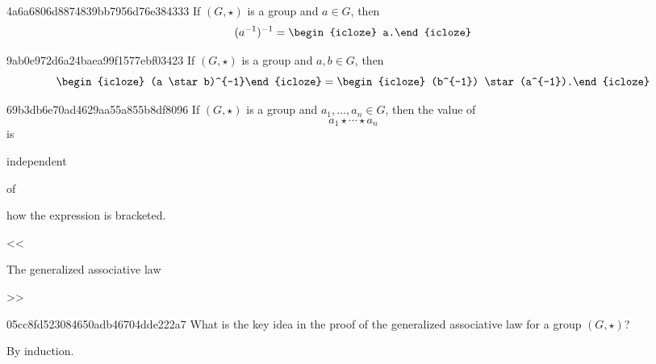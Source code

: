 \begin{note}{4a6a6806d8874839bb7956d76e384333}
    If \({ (G, \star) }\) is a group and \({ a \in G }\), then
    \[
        (a^{-1})^{-1} = \begin{icloze}{1}a.\end{icloze}
    \]
\end{note}

\begin{note}{9ab0e972d6a24baea99f1577ebf03423}
    If \({ (G, \star) }\) is a group and \({ a, b \in G }\), then
    \[
        \begin{icloze}{2}(a \star b)^{-1}\end{icloze} = \begin{icloze}{1}(b^{-1}) \star (a^{-1}).\end{icloze}
    \]
\end{note}

\begin{note}{69b3db6e70ad4629aa55a855b8df8096}
    If \({ (G, \star) }\) is a group and \({ a_1, \ldots, a_n \in G }\), then
    the value of
    \[
        a_1 \star \cdots \star a_n
    \]
    is \begin{icloze}{2}independent\end{icloze} of \begin{icloze}{1}how the expression is bracketed.\end{icloze}

    \begin{center}
        \tiny
        <<\begin{icloze}{3}The generalized associative law\end{icloze}>>
    \end{center}
\end{note}

\begin{note}{05cc8fd523084650adb46704dde222a7}
    What is the key idea in the proof of the generalized associative law for a group \({ (G, \star) }\)?

    \begin{cloze}{1}
        By induction.
    \end{cloze}
\end{note}


